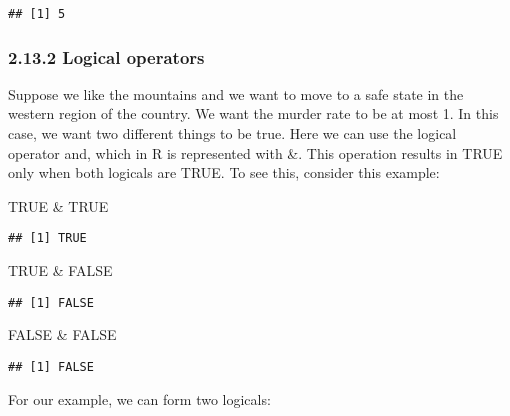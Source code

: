 \documentclass[
]{article}
\newenvironment{Shaded}{\begin{snugshade}}{\end{snugshade}}
\newcommand{\ConstantTok}[1]{\textcolor[rgb]{0.00,0.00,0.00}{#1}}
\newcommand{\DecValTok}[1]{\textcolor[rgb]{0.00,0.00,0.81}{#1}}
\newcommand{\NormalTok}[1]{#1}
\newcommand{\OtherTok}[1]{\textcolor[rgb]{0.56,0.35,0.01}{#1}}
\newcommand{\SpecialCharTok}[1]{\textcolor[rgb]{0.00,0.00,0.00}{#1}}
\newcommand{\StringTok}[1]{\textcolor[rgb]{0.31,0.60,0.02}{#1}}
\begin{document}
\begin{verbatim}
## [1] 5
\end{verbatim}

\hypertarget{logical-operators}{%
\subsubsection{2.13.2 Logical operators}\label{logical-operators}}

Suppose we like the mountains and we want to move to a safe state in the
western region of the country. We want the murder rate to be at most 1.
In this case, we want two different things to be true. Here we can use
the logical operator and, which in R is represented with \&. This
operation results in TRUE only when both logicals are TRUE. To see this,
consider this example:

\begin{Shaded}
\begin{Highlighting}[]
\ConstantTok{TRUE} \SpecialCharTok{\&} \ConstantTok{TRUE}
\end{Highlighting}
\end{Shaded}

\begin{verbatim}
## [1] TRUE
\end{verbatim}

\begin{Shaded}
\begin{Highlighting}[]
\ConstantTok{TRUE} \SpecialCharTok{\&} \ConstantTok{FALSE}
\end{Highlighting}
\end{Shaded}

\begin{verbatim}
## [1] FALSE
\end{verbatim}

\begin{Shaded}
\begin{Highlighting}[]
\ConstantTok{FALSE} \SpecialCharTok{\&} \ConstantTok{FALSE}
\end{Highlighting}
\end{Shaded}

\begin{verbatim}
## [1] FALSE
\end{verbatim}

For our example, we can form two logicals:

\begin{Shaded}
\end{Shaded}
\end{document}
